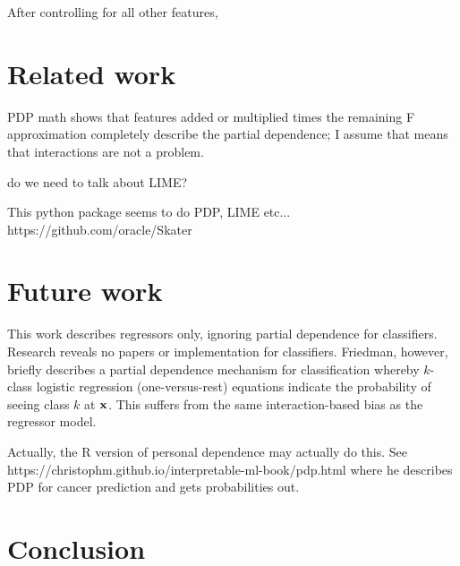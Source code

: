 \documentclass[12pt]{article}
\begin{document}
After controlling for all other features,




\section{Related work}

PDP math shows that features added or multiplied times the remaining F approximation completely describe the partial dependence; I assume that means that interactions are not a problem.

do we need to talk about LIME?
 
This python package seems to do PDP, LIME etc... https://github.com/oracle/Skater

\section{Future work}

This work describes regressors only, ignoring partial dependence for classifiers.  Research reveals no papers or implementation for classifiers. Friedman, however, briefly describes a partial dependence mechanism for classification whereby $k$-class logistic regression (one-versus-rest) equations indicate the probability of seeing class $k$ at $\bf{x}$.  This suffers from the same interaction-based bias as the regressor model.

Actually, the R version of personal dependence may actually do this. See https://christophm.github.io/interpretable-ml-book/pdp.html where he describes PDP for cancer prediction and gets probabilities out.

\section{Conclusion}
\label{sec:conc}




\end{document}
